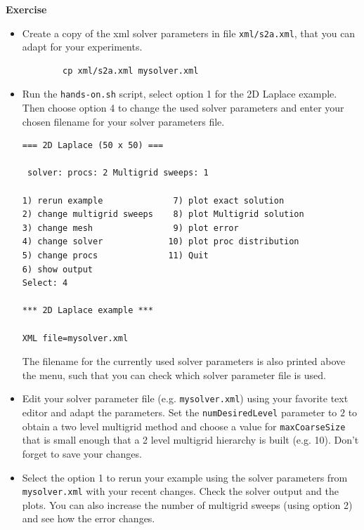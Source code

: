 \documentclass[12pt,a4paper]{article}
\begin{document}
\begin{graybox}
 \textbf{Exercise}
 \begin{itemize}
  \item Create a copy of the xml solver parameters in file \verb|xml/s2a.xml|, that you can adapt for your experiments.
        \begin{verbatim}
        cp xml/s2a.xml mysolver.xml
        \end{verbatim}
  \item Run the \verb|hands-on.sh| script, select option 1 for the 2D Laplace example. Then choose option 4 to change the used solver parameters and enter your chosen filename for your solver parameters file.
        \begin{verbatim}
=== 2D Laplace (50 x 50) === 

 solver: procs: 2 Multigrid sweeps: 1
 
1) rerun example              7) plot exact solution
2) change multigrid sweeps    8) plot Multigrid solution
3) change mesh                9) plot error
4) change solver             10) plot proc distribution
5) change procs              11) Quit
6) show output
Select: 4

*** 2D Laplace example ***

XML file=mysolver.xml
        \end{verbatim}
        The filename for the currently used solver parameters is also printed above the menu, such that you can check which solver parameter file is used.
   \item Edit your solver parameter file (e.g. \verb|mysolver.xml|) using your favorite text editor and adapt the parameters. Set the \texttt{numDesiredLevel} parameter to $2$ to obtain a two level multigrid method and choose a value for \texttt{maxCoarseSize} that is small enough that a 2 level multigrid hierarchy is built (e.g. 10). Don't forget to save your changes.
   \item Select the option 1 to rerun your example using the solver parameters from \verb|mysolver.xml| with your recent changes. Check the solver output and the plots. You can also increase the number of multigrid sweeps (using option 2) and see how the error changes.
 \end{itemize}
\end{graybox}
\end{document}
